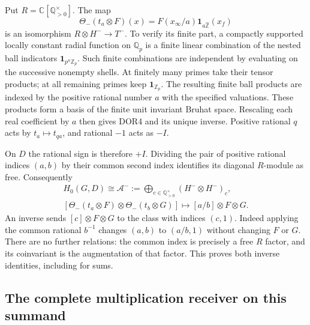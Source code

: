 Put $R=\mathbb C[\mathbb Q_{>0}^{\times}]$. The map
\begin{equation}\tag{DOR4}
\Theta_-(t_a\otimes F)(x)=F(x_\infty/a)
                              \mathbf1_{a\widehat{\mathbb Z}}(x_f)
\end{equation}
is an isomorphism $R\otimes H^-\to T^-$. To verify its finite part,
a compactly supported locally constant radial function on
$\mathbb Q_p$ is a finite linear combination of the nested ball
indicators $\mathbf1_{p^n\mathbb Z_p}$. Such finite combinations
are independent by evaluating on the successive nonempty shells.
At finitely many primes take their tensor products; at all remaining
primes keep $\mathbf1_{\mathbb Z_p}$. The resulting finite ball
products are indexed by the positive rational number $a$ with the
specified valuations. These products form a basis of the finite
unit invariant Bruhat space. Rescaling each real coefficient by $a$
then gives DOR4 and its unique inverse. Positive rational $q$ acts
by $t_a\mapsto t_{qa}$, and rational $-1$ acts as $-I$.

On $D$ the rational sign is therefore $+I$. Dividing the pair of
positive rational indices $(a,b)$ by their common second index
identifies its diagonal $R$-module as free. Consequently
\begin{equation}\tag{DOR5}
\begin{gathered}
H_0(G,D)\cong
\mathcal A^-:=\bigoplus_{c\in\mathbb Q_{>0}^{\times}}
                         (H^-\otimes H^-)_c,\\
[\Theta_-(t_a\otimes F)\otimes\Theta_-(t_b\otimes G)]
\longmapsto [a/b]\otimes F\otimes G.
\end{gathered}
\end{equation}
An inverse sends $[c]\otimes F\otimes G$ to the class with
indices $(c,1)$. Indeed applying the common rational $b^{-1}$
changes $(a,b)$ to $(a/b,1)$ without changing $F$ or $G$.
There are no further relations: the common index is precisely a
free $R$ factor, and its coinvariant is the augmentation of that
factor. This proves both inverse identities, including for sums.

\subsection{The complete multiplication receiver on this summand}

